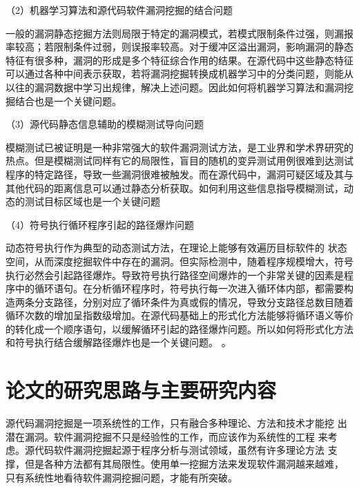 （2）机器学习算法和源代码软件漏洞挖掘的结合问题

一般的漏洞静态挖掘方法则局限于特定的漏洞模式，若模式限制条件过强，则漏报率较高；若限制条件过弱，则误报率较高。对于缓冲区溢出漏洞，影响漏洞的静态特征有很多种，漏洞的形成是多个特征综合作用的结果。在源代码中这些静态特征可以通过各种中间表示获取，若将漏洞挖掘转换成机器学习中的分类问题，则能从以往的漏洞数据中学习出规律，解决上述问题。因此如何将机器学习算法和漏洞挖掘结合也是一个关键问题。



（3）源代码静态信息辅助的模糊测试导向问题

模糊测试已被证明是一种非常强大的软件漏洞测试方法，是工业界和学术界研究的热点。但是模糊测试同样有它的局限性，盲目的随机的变异测试用例很难到达测试程序的特定路径，导致一些漏洞很难被触发。而在源代码中，漏洞可疑区域及其与其他代码的距离信息可以通过静态分析获取。如何利用这些信息指导模糊测试，动态的测试目标区域也是一个关键问题

（4）符号执行循环程序引起的路径爆炸问题

动态符号执行作为典型的动态测试方法，在理论上能够有效遍历目标软件的 %
状态空间，从而深度挖掘软件中存在的漏洞。但实际检测中，随着程序规模增大，符号执行必然会引起路径爆炸。导致符号执行路径空间爆炸的一个非常关键的因素是程序中的循环语句。在分析循环程序时，符号执行每一次进入循环体内部，都需要构造两条分支路径，分别对应了循环条件为真或假的情况，导致分支路径总数目随着循环次数的增加呈指数级增加。在源代码基础上的形式化方法能够将循环语义等价的转化成一个顺序语句，以缓解循环引起的路径爆炸问题。所以如何将形式化方法和符号执行结合缓解路径爆炸也是一个关键问题。
。

\section{论文的研究思路与主要研究内容}
源代码漏洞挖掘是一项系统性的工作，只有融合多种理论、方法和技术才能挖
出潜在漏洞。软件漏洞挖掘不只是经验性的工作，而应该作为系统性的工程
来考虑。源代码软件漏洞挖掘起源于程序分析与测试领域，虽然有许多理论方法
支撑，但是各种方法都有其局限性。使用单一挖掘方法来发现软件漏洞越来越难，
只有系统性地看待软件漏洞挖掘问题，才能有所突破。

